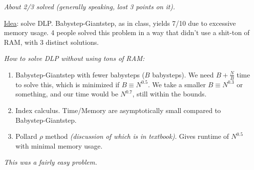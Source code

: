 \begin{problem}
\emph{About 2/3 solved (generally speaking, lost 3 points on it).}

\ul{Idea}: solve DLP. Babystep-Giantstep, as in class, yields 7/10 due to excessive memory usage. 4 people solved this problem in a way that didn't use a shit-ton of RAM, with 3 distinct solutions.

\emph{How to solve DLP without using tons of RAM:}
\begin{enumerate}
    \item Babystep-Giantstep with fewer babysteps ($B$ babysteps). We need $B + \frac{N}{B}$ time to solve this, which is minimized if $B\equiv N^{0.5}$. We take a smaller $B\equiv N^{0.3}$ or something, and our time would be $N^{0.7}$, still within the bounds.
    \item Index calculus. Time/Memory are asymptotically small compared to Babystep-Giantstep.
    \item Pollard $\rho$ method \emph{(discussion of which is in textbook)}. Gives runtime of $N^{0.5}$ with minimal memory usage.
\end{enumerate}

\end{problem}

\begin{problem}
\emph{This was a fairly easy problem.}
\end{problem}
